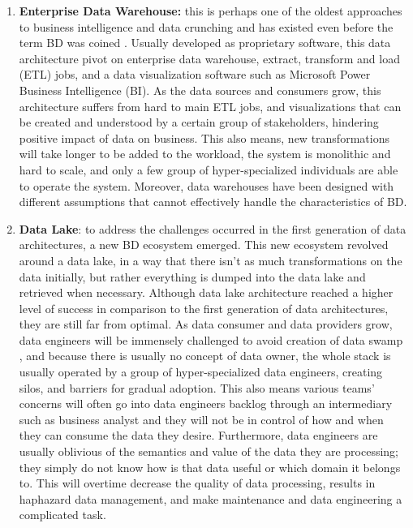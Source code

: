\documentclass[review]{elsarticle}
\begin{document}
\begin{enumerate}
    \item \textbf{Enterprise Data Warehouse:} this is perhaps one of the oldest approaches to business intelligence and data crunching and has existed even before the term BD was coined \cite{leonard2011design}. Usually developed as proprietary software, this data architecture pivot on enterprise data warehouse, extract, transform and load (ETL) jobs, and a data visualization software such as Microsoft Power Business Intelligence (BI). As the data sources and consumers grow, this architecture suffers from hard to main ETL jobs, and visualizations that can be created and understood by a certain group of stakeholders, hindering positive impact of data on business. This also means, new transformations will take longer to be added to the workload, the system is monolithic and hard to scale, and only a few group of hyper-specialized individuals are able to operate the system. Moreover, data warehouses have been designed with different assumptions that cannot effectively handle the characteristics of BD.
    \item \textbf{Data Lake}: to address the challenges occurred in the first generation of data architectures, a new BD ecosystem emerged. This new ecosystem revolved around a data lake, in a way that there isn't as much transformations on the data initially, but rather everything is dumped into the data lake and retrieved when necessary. Although data lake architecture reached a higher level of success in comparison to the first generation of data architectures, they are still far from optimal. As data consumer and data providers grow, data engineers will be immensely challenged to avoid creation of data swamp \cite{brackenbury2018draining}, and because there is usually no concept of data owner, the whole stack is usually operated by a group of hyper-specialized data engineers, creating silos, and barriers for gradual adoption. This also means various teams' concerns will often go into data engineers backlog through an intermediary such as business analyst and they will not be in control of how and when they can consume the data they desire. Furthermore, data engineers are usually oblivious of the semantics and value of the data they are processing; they simply do not know how is that data useful or which domain it belongs to. This will overtime decrease the quality of data processing, results in haphazard data management, and make maintenance and data engineering a complicated task. 

\end{enumerate}
\end{document}
